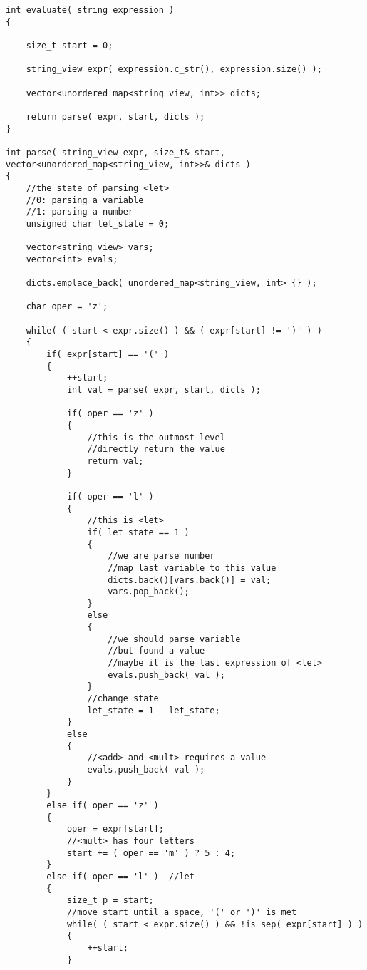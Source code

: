 \setcounter{lstlisting}{0}
\begin{lstlisting}[style=customc, caption={Recursive Parsing}]
int evaluate( string expression )
{

    size_t start = 0;

    string_view expr( expression.c_str(), expression.size() );

    vector<unordered_map<string_view, int>> dicts;

    return parse( expr, start, dicts );
}

int parse( string_view expr, size_t& start, vector<unordered_map<string_view, int>>& dicts )
{
    //the state of parsing <let>
    //0: parsing a variable
    //1: parsing a number
    unsigned char let_state = 0;

    vector<string_view> vars;
    vector<int> evals;

    dicts.emplace_back( unordered_map<string_view, int> {} );

    char oper = 'z';

    while( ( start < expr.size() ) && ( expr[start] != ')' ) )
    {
        if( expr[start] == '(' )
        {
            ++start;
            int val = parse( expr, start, dicts );

            if( oper == 'z' )
            {
                //this is the outmost level
                //directly return the value
                return val;
            }

            if( oper == 'l' )
            {
                //this is <let>
                if( let_state == 1 )
                {
                    //we are parse number
                    //map last variable to this value
                    dicts.back()[vars.back()] = val;
                    vars.pop_back();
                }
                else
                {
                    //we should parse variable
                    //but found a value
                    //maybe it is the last expression of <let>
                    evals.push_back( val );
                }
                //change state
                let_state = 1 - let_state;
            }
            else
            {
                //<add> and <mult> requires a value
                evals.push_back( val );
            }
        }
        else if( oper == 'z' )
        {
            oper = expr[start];
            //<mult> has four letters
            start += ( oper == 'm' ) ? 5 : 4;
        }
        else if( oper == 'l' )  //let
        {
            size_t p = start;
            //move start until a space, '(' or ')' is met
            while( ( start < expr.size() ) && !is_sep( expr[start] ) )
            {
                ++start;
            }


\end{lstlisting}
